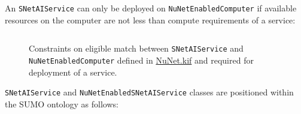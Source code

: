 \documentclass[]{report}
\begin{document}
An \texttt{SNetAIService} can only be deployed on \texttt{NuNetEnabledComputer}
if available resources on the computer are not less than compute requirements of
a service:

\begin{figure}[H]
  \centering
  \inputminted[firstline=38, lastline=47, linenos,tabsize=2,breaklines,
  fontsize=\small]{scm}{../../../ontology/NuNet.kif}
  \captionsetup{width=1\linewidth}
  \vspace{-0.3cm}
  \caption{Constraints on eligible match between \texttt{SNetAIService} and
  \texttt{NuNetEnabledComputer} defined in
  \href{https://github.com/singnet/ai-dsl/blob/master/ontology/NuNet.kif}{NuNet.kif}
  and required for deployment of a service.}
  \label{fig:service_deployment_requirements}
\end{figure}

\texttt{SNetAIService} and \texttt{NuNetEnabledSNetAIService} classes are positioned within the SUMO ontology as follows:
\end{document}

